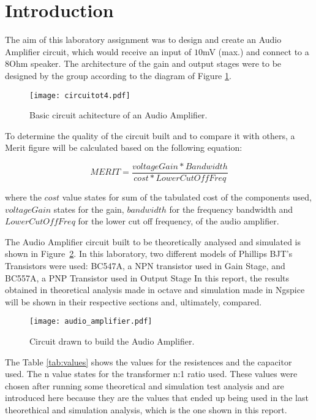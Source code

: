 \newpage
\section{Introduction}
\label{sec:introduction}


The aim of this laboratory assignment was to design and create an Audio Amplifier circuit, which would receive an input of $10$mV (max.) and connect to a $8$Ohm speaker. The architecture of the gain and output stages were to be designed by the group according to the diagram of Figure \ref{fig:t4}. 

\begin{figure}[h] \centering
	\texttt{[image: circuitot4.pdf]}
	\caption{Basic circuit achitecture of an Audio Amplifier.}
	\label{fig:t4}
\end{figure}


To determine the quality of the circuit built and to compare it with others, a Merit figure will be calculated based on the following equation: 

\begin {equation}
	MERIT = \frac{voltageGain*Bandwidth}{cost*LowerCutOffFreq}   	
\label{eq:merit}
\end{equation}

where the $cost$ value states for sum of the tabulated cost of the components used, $voltageGain$ states for the gain, $bandwidth$ for the frequency bandwidth and $LowerCutOffFreq$ for the lower cut off frequency, of the audio amplifier.

The Audio Amplifier circuit built to be theoretically analysed and simulated is shown in Figure~\ref{fig:audio_amplifier}. 
In this laboratory, two different models of Phillips BJT's Transistors were used: BC547A, a NPN transistor used in Gain Stage, and BC557A, a PNP Transistor used in Output Stage
In this report, the results obtained in theoretical analysis made in octave and simulation made in Ngspice will be shown in their respective sections and, ultimately, compared.

\begin{figure}[H] \centering
	\texttt{[image: audio\_amplifier.pdf]}
	\caption{Circuit drawn to build the Audio Amplifier.}
	\label{fig:audio_amplifier}
\end{figure}

The Table \ref{tab:values} shows the values for the resistences and the capacitor used. The n value states for the transformer n:1 ratio used. These values were chosen after running some theoretical and simulation test analysis and are introduced here because they are the values that ended up being used in the last theorethical and simulation analysis, which is the one shown in this report.

